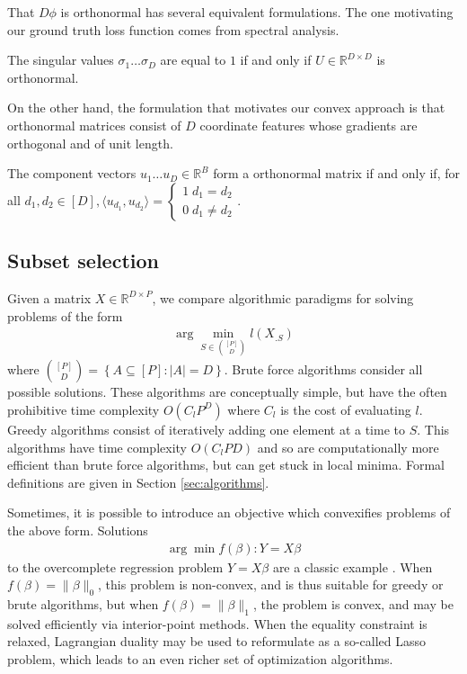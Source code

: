 That $D\phi$ is orthonormal has several equivalent formulations.
The one motivating our ground truth loss function comes from spectral analysis.
\begin{proposition}
\label{prop:orthonormal_spectrum}
The singular values $\sigma_1 \dots \sigma_D$ are equal to $1$ if and only if $U \in \mathbb{R}^{D \times D}$ is orthonormal.
\end{proposition}
On the other hand, the formulation that motivates our convex approach is that orthonormal matrices consist of $D$ coordinate features whose gradients are orthogonal and of unit length.
\begin{proposition}
\label{prop:orthonormal_basis}
The component vectors $u_1 \dots u_D \in \mathbb R^B$ form a orthonormal matrix if and only if, for all $d_1, d_2 \in [D], \langle u_{d_1}, u_{d_2} \rangle = \begin{cases}
1 \; d_1 = d_2 \\ 
0 \; d_1 \neq d_2 
\end{cases}$.
\end{proposition}

\subsection{Subset selection}

Given a matrix $ X \in \mathbb R^{D \times P}$, we compare algorithmic paradigms for solving problems of the form
\begin{align}
\label{prog:ground_truth}
\arg \min_{ S \in \binom{[P]}{D}} l ( X_{. S})
\end{align}
where $\binom{[P]}{D} = \left\{ A \subseteq [P] : \left|A\right| = D \right\}$.
Brute force algorithms consider all possible solutions.
These algorithms are conceptually simple, but have the often prohibitive time complexity $O(C_lP^D)$ where $C_l$ is the cost of evaluating $l$.
Greedy algorithms consist of iteratively adding one element at a time to $ S$.
This algorithms have time complexity $O(C_lPD)$ and so are computationally more efficient than brute force algorithms, but can get stuck in local minima.
Formal definitions are given in Section \ref{sec:algorithms}.

Sometimes, it is possible to introduce an objective which convexifies problems of the above form.
Solutions
\begin{align}
\arg \min f(\beta) : Y  = X\beta 
\end{align}
to the overcomplete regression problem $Y = X \beta$ are a classic example \citep{Chen2001-hh}.
When $f(\beta) = \|\beta\|_0$, this problem is non-convex, and is thus suitable for greedy or brute algorithms, but when $f(\beta) =\|\beta\|_1$, the problem is convex, and may be solved efficiently via interior-point methods.
When the equality constraint is relaxed, Lagrangian duality may be used to reformulate as a so-called Lasso problem, which leads to an even richer set of optimization algorithms. %

